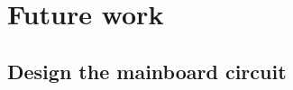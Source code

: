 \documentclass[12pt,a4paper]{article}%
\newtheorem{theorem}{Theorem}
\begin{document}


\section{Future work}

\subsection{Design the mainboard circuit}




\end{document}
